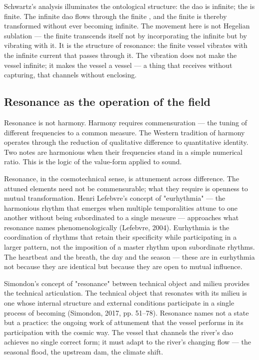 Schwartz's analysis illuminates the ontological structure: the dao is infinite; the  is finite. The infinite dao flows through the finite , and the finite  is thereby transformed without ever becoming infinite. The movement here is not Hegelian sublation — the finite transcends itself not by incorporating the infinite but by vibrating with it. It is the structure of resonance: the finite vessel vibrates with the infinite current that passes through it. The vibration does not make the vessel infinite; it makes the vessel a vessel — a thing that receives without capturing, that channels without enclosing.

\subsection{Resonance as the operation of the field}

Resonance is not harmony. Harmony requires commensuration — the tuning of different frequencies to a common measure. The Western tradition of harmony operates through the reduction of qualitative difference to quantitative identity. Two notes are harmonious when their frequencies stand in a simple numerical ratio. This is the logic of the value-form applied to sound.

Resonance, in the cosmotechnical sense, is attunement across difference. The attuned elements need not be commensurable; what they require is openness to mutual transformation. Henri Lefebvre's concept of "eurhythmia" — the harmonious rhythm that emerges when multiple temporalities attune to one another without being subordinated to a single measure — approaches what resonance names phenomenologically (Lefebvre, 2004). Eurhythmia is the coordination of rhythms that retain their specificity while participating in a larger pattern, not the imposition of a master rhythm upon subordinate rhythms. The heartbeat and the breath, the day and the season — these are in eurhythmia not because they are identical but because they are open to mutual influence.

Simondon's concept of "resonance" between technical object and milieu provides the technical articulation. The technical object that resonates with its milieu is one whose internal structure and external conditions participate in a single process of becoming (Simondon, 2017, pp. 51–78). Resonance names not a state but a practice: the ongoing work of attunement that the vessel performs in its participation with the cosmic way. The vessel that channels the river's dao achieves no single correct form; it must adapt to the river's changing flow — the seasonal flood, the upstream dam, the climate shift.

